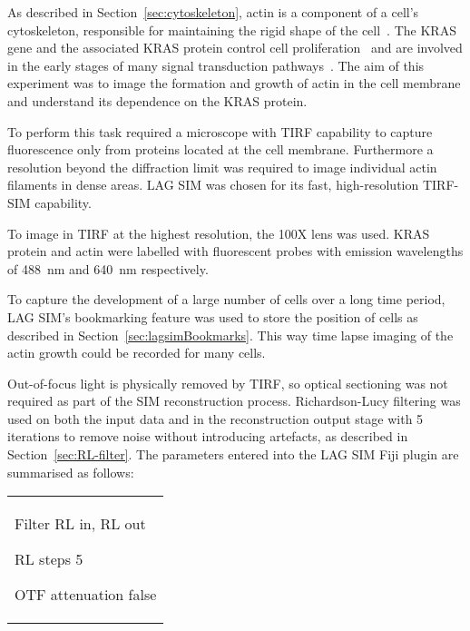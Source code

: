 As described in Section~\ref{sec:cytoskeleton}, actin is a component of a cell's cytoskeleton, responsible for maintaining the rigid shape of the cell~\cite{alberts2013essential}.
The KRAS gene and the associated KRAS protein control cell proliferation~\cite{zimmermann2013small} and are involved in the early stages of many signal transduction pathways~\cite{downward2003targeting, kranenburg2005kras}.
The aim of this experiment was to image the formation and growth of actin in the cell membrane and understand its dependence on the KRAS protein.

To perform this task required a microscope with TIRF capability to capture fluorescence only from proteins located at the cell membrane.
Furthermore a resolution beyond the diffraction limit was required to image individual actin filaments in dense areas.
LAG SIM was chosen for its fast, high-resolution TIRF-SIM capability.

To image in TIRF at the highest resolution, the 100X  lens was used.
KRAS protein and actin were labelled with fluorescent probes with emission wavelengths of \SI{488}{\nano\metre} and \SI{640}{\nano\metre} respectively.

To capture the development of a large number of cells over a long time period, LAG SIM's bookmarking feature was used to store the position of cells as described in Section~\ref{sec:lagsimBookmarks}.
This way time lapse imaging of the actin growth could be recorded for many cells.

Out-of-focus light is physically removed by TIRF, so optical sectioning was not required as part of the SIM reconstruction process.
Richardson-Lucy filtering was used on both the input data and in the reconstruction output stage with 5 iterations to remove noise without introducing artefacts, as described in Section~\ref{sec:RL-filter}.
The parameters entered into the LAG SIM Fiji plugin are summarised as follows: \newline
\begin{tabular}{p{}}
\begin{labelling}[margin=OTF attenuation]
	\item[Filter] RL in, RL out
	\item[RL steps] 5
	\item[OTF attenuation] false
\end{labelling}
\end{tabular}

